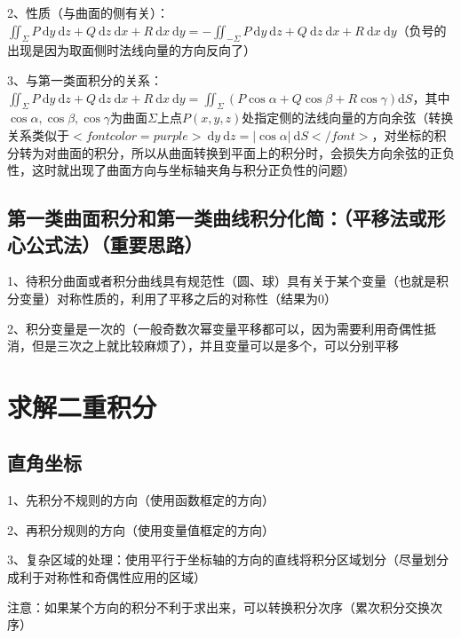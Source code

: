 2、性质（与曲面的侧有关）：$ \iint_{\Sigma} P \mathrm{~d} y \mathrm{~d} z+Q \mathrm{~d} z \mathrm{~d} x+R \mathrm{~d} x \mathrm{~d} y=-\iint_{-\Sigma} P \mathrm{~d} y \mathrm{~d} z+Q \mathrm{~d} z \mathrm{~d} x+R \mathrm{~d} x \mathrm{~d} y $（负号的出现是因为取面侧时法线向量的方向反向了）

3、与第一类面积分的关系：$ \iint_{\Sigma} P \mathrm{~d} y \mathrm{~d} z+Q \mathrm{~d} z \mathrm{~d} x+R \mathrm{~d} x \mathrm{~d} y=\iint_{\Sigma}(P \cos \alpha+Q \cos \beta+R \cos \gamma) \mathrm{d} S $，其中$ \cos \alpha, \cos \beta, \cos \gamma $为曲面$ \Sigma $上点$ P(x, y, z) $处指定侧的法线向量的方向余弦（转换关系类似于$ <font color=purple>\mathrm{~d} y \mathrm{~d} z = |\cos \alpha| \ \mathrm{d} S</font> $，对坐标的积分转为对曲面的积分，所以从曲面转换到平面上的积分时，会损失方向余弦的正负性，这时就出现了曲面方向与坐标轴夹角与积分正负性的问题）



\subsection{第一类曲面积分和第一类曲线积分化简：（平移法或形心公式法）（重要思路）}

1、待积分曲面或者积分曲线具有规范性（圆、球）具有关于某个变量（也就是积分变量）对称性质的，利用了平移之后的对称性（结果为0）

2、积分变量是一次的（一般奇数次幂变量平移都可以，因为需要利用奇偶性抵消，但是三次之上就比较麻烦了），并且变量可以是多个，可以分别平移

\section{求解二重积分}



\subsection{直角坐标}

1、先积分不规则的方向（使用函数框定的方向）

2、再积分规则的方向（使用变量值框定的方向）

3、复杂区域的处理：使用平行于坐标轴的方向的直线将积分区域划分（尽量划分成利于对称性和奇偶性应用的区域）

注意：如果某个方向的积分不利于求出来，可以转换积分次序（累次积分交换次序）




